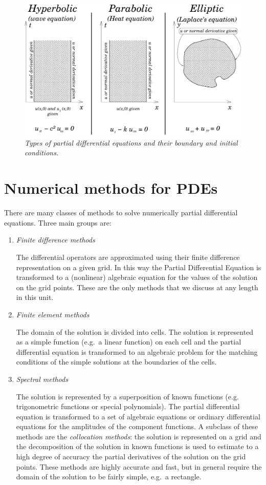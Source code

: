 \begin{figure}
  \centerline{\includegraphics[width=120mm]{figures/pde_summary}}
  \caption{\label{fig:pde_summary} \it Types of partial differential
    equations and their boundary and initial conditions.}
\end{figure}

\section{Numerical methods for PDEs}

There are many classes of methods to solve numerically partial
differential equations.  Three main groups are:

\begin{enumerate}
\item \textit{Finite difference methods}

  The differential operators are approximated using their finite
  difference representation on a given grid.  In this way the Partial
  Differential Equation is transformed to a (nonlinear) algebraic
  equation for the values of the solution on the grid points.  These
  are the only methods that we discuss at any length in this unit.
\item \textit{Finite element methods}

  The domain of the solution is divided into cells.  The solution is
  represented as a simple function (e.g.\ a linear function) on each
  cell and the partial differential equation is transformed to an
  algebraic problem for the matching conditions of the simple
  solutions at the boundaries of the cells.
\item \textit{Spectral methods}

  The solution is represented by a superposition of known functions
  (e.g. trigonometric functions or special polynomials).  The partial
  differential equation is transformed to a set of algebraic equations
  or ordinary differential equations for the amplitudes of the
  component functions.  A subclass of these methods are the
  \textit{collocation methods}: the solution is represented on a grid
  and the decomposition of the solution in known functions is used to
  estimate to a high degree of accuracy the partial derivatives of the
  solution on the grid points.  These methods are highly accurate and
  fast, but in general require the domain of the solution to be fairly
  simple, e.g.\ a rectangle.
\end{enumerate}


